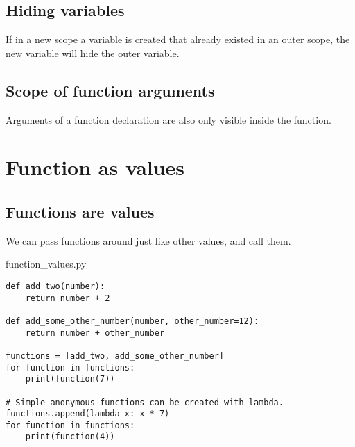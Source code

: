 \documentclass[aspectratio=1610,slidestop]{beamer}
\begin{document}
\subsection{Hiding variables}
\begin{pframe}
 If in a new scope a variable is created that already existed in an outer scope,
 the new variable will hide the outer variable.
\end{pframe}


\subsection{Scope of function arguments}
\begin{pframe}
 Arguments of a function declaration are also only visible inside the function.
\end{pframe}


\section{Function as values}

\subsection{Functions are values}
\begin{pframe}
 We can pass functions around just like other values, and call them.
 \begin{pythonfile}{function\_values.py}
  \begin{verbatim}
def add_two(number):
    return number + 2

def add_some_other_number(number, other_number=12):
    return number + other_number

functions = [add_two, add_some_other_number]
for function in functions:
    print(function(7))

# Simple anonymous functions can be created with lambda.
functions.append(lambda x: x * 7)
for function in functions:
    print(function(4))
  \end{verbatim}
 \end{pythonfile}
\end{pframe}
\end{document}

